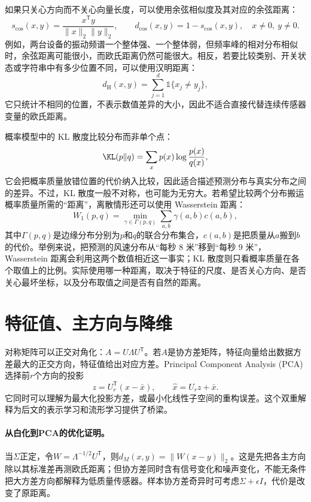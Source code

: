 如果只关心方向而不关心向量长度，可以使用余弦相似度及其对应的余弦距离：
\begin{equation}
 s_{\cos}(x,y)=\frac{x^{\mathsf T}y}{\|x\|_2\|y\|_2},\qquad
 d_{\cos}(x,y)=1-s_{\cos}(x,y),
 \quad x\ne0,\ y\ne0.\label{eq:math-cosine-distance}
\end{equation}
例如，两台设备的振动频谱一个整体强、一个整体弱，但频率峰的相对分布相似时，余弦距离可能很小，而欧氏距离仍然可能很大。相反，若要比较类别、开关状态或字符串中有多少位置不同，可以使用汉明距离：
\begin{equation}
 d_{\mathrm H}(x,y)=\sum_{j=1}^{d}\mathbb{1}\{x_j\ne y_j\},\label{eq:math-hamming-distance}
\end{equation}
它只统计不相同的位置，不表示数值差异的大小，因此不适合直接代替连续传感器变量的欧氏距离。

概率模型中的 KL 散度比较分布而非单个点：
\begin{equation}
 \KL(p\|q)=\sum_xp(x)\log\frac{p(x)}{q(x)},\label{eq:math-kl-distance}
\end{equation}
它会把概率质量放错位置的代价纳入比较，因此适合描述预测分布与真实分布之间的差异。不过，KL 散度一般不对称，也可能为无穷大。若希望比较两个分布搬运概率质量所需的“距离”，离散情形还可以使用 Wasserstein 距离：
\begin{equation}
 W_1(p,q)=\min_{\gamma\in\Gamma(p,q)}
 \sum_{a,b}\gamma(a,b)c(a,b),\label{eq:math-wasserstein-distance}
\end{equation}
其中$\Gamma(p,q)$是边缘分布分别为$p$和$q$的联合分布集合，$c(a,b)$是把质量从$a$搬到$b$的代价。举例来说，把预测的风速分布从“每秒 8 米”移到“每秒 9 米”，Wasserstein 距离会利用这两个数值相近这一事实；KL 散度则只看概率质量在各个取值上的比例。实际使用哪一种距离，取决于特征的尺度、是否关心方向、是否关心最坏坐标，以及分布取值之间是否有自然的距离。

\section{特征值、主方向与降维}
对称矩阵可以正交对角化：$A=U\Lambda U^{\mathsf T}$。若$A$是协方差矩阵，特征向量给出数据方差最大的正交方向，特征值给出对应方差。Principal Component Analysis (PCA) 选择前$r$个方向的投影
\begin{equation}
 z=U_r^{\mathsf T}(x-\bar x),
 \qquad \hat x=U_rz+\bar x.
\end{equation}
它同时可以理解为最大化投影方差，或最小化线性子空间的重构误差。这个双重解释为后文的表示学习和流形学习提供了桥梁。

\paragraph{从白化到PCA的优化证明。}
当$\Sigma$正定，令$W=\Lambda^{-1/2}U^{\mathsf T}$，则$d_M(x,y)=\|W(x-y)\|_2$。这是先把各主方向除以其标准差再测欧氏距离；但协方差同时含有信号变化和噪声变化，不能无条件把大方差方向都解释为低质量传感器。样本协方差奇异时可考虑$\Sigma+\epsilon I$，代价是改变了原距离。

